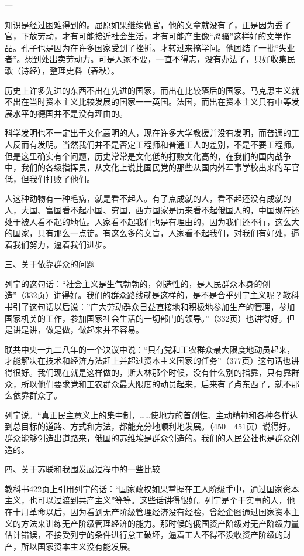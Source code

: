 一

知识是经过困难得到的。屈原如果继续做官，他的文章就没有了，正是因为丢了官，下放劳动，才有可能接近社会生活，才有可能产生像“离骚”这样好的文学作品。孔子也是因为在许多国家受到了挫折。才转过来搞学问。他团结了一批“失业者”。想到处出卖劳动力。可是人家不要，一直不得志，没有办法了，只好收集民歌（诗经），整理史料（春秋）。

历史上许多先进的东西不出在先进的国家，而出在比较落后的国家。马克思主义就不出在当时资本主义比较发展的国家一一英国。法国，而出在资本主义只有中等发展水平的德国并不是没有理由的。

科学发明也不一定出于文化高明的人，现在许多大学教援并没有发明，而普通的工人反而有发明。当然我们并不是否定工程师和普通工人的差别，不是不要工程师。但是这里确实有个问题，历史常常是文化低的打败文化高的，在我们的国内战争中，我们的各级指挥员，从文化上说比国民党的那些从国内外军事学校出来的军官低，但我们打败了他们。

人这种动物有一种毛病，就是看不起人。有了点成就的人，看不起还没有成就的人，大国、富国看不起小国、穷国，西方国家是历来看不起俄国人的，中国现在还处于被人看不起的地位。人家看不起我们也是有理由的，因为我们还不行，这么大的国家，只有那么一点锭。有这么多的文盲，人家看不起我们，对我们有好处，逼着我们努力，逼着我们进步。

三、关于依靠群众的问题

列宁的这句话：“社会主义是生气勃勃的，创造性的，是人民群众本身的创造”（332页）讲得好。我们的群众路线就是这样的，是不是合乎列宁主义呢？教科书引了这句话以后说：”广大劳动群众日益直接地和积极地参加生产的管理，参加国家机关的工作，参加国家社会生活的一切部门的领导。”（332页）也讲得好。但是讲是讲，做是做，做起来并不容易。

联共中央一九二八年的一个决议中说：“只有党和工农群众最大限度地动员起来，才能解决在技术和经济方法赶上并超过资本主义国家的任务”（377页）这句话也讲得很好。我们现在就是这样做的，斯大林那个时候，没有什么别的指靠，只有靠群众，所以他们要求党和工农群众最大限度的动员起来，后来有了点东西了，就不那么依靠群众了。

列宁说。“真正民主意义上的集中制，……使地方的首创性、主动精神和各种各样达到总目标的道路、方式和方法，都能充分地顺利地发展。（450－451页）说得好。群众能够创造出道路来，俄国的苏维埃是群众创造的。我们的人民公社也是群众创造的。

四、关于苏联和我围发展过程中的一些比较

教科书422页上引用列宁的话：“国家政权如果掌握在工人阶级手中，通过国家资本主义，也可以过渡到共产主义”等等。这些话讲得很好。列宁是个干实事的人，他在十月革命以后，因为看到无产阶级管理经济没有经验，曾经企图通过国家资本主义的方法来训练无产阶级管理经济的能力。那时候的俄国资产阶级对无产阶级力量估计错误，不接受列宁的条件进行怠工破坏，逼着工人不得不没收资产阶级的财产，所以国家资本主义没有能发展。

